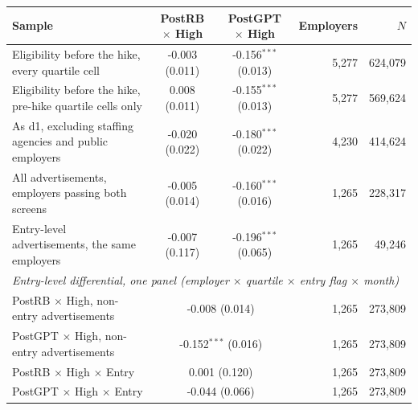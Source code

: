 \setlength{\tabcolsep}{3.5pt}
\begin{tabular}{lccrr}
\toprule
Sample & PostRB $\times$ High & PostGPT $\times$ High & Employers & $N$ \\
\midrule
Eligibility before the hike, every quartile cell & -0.003 (0.011) & -0.156$^{***}$ (0.013) & 5,277 & 624,079 \\
Eligibility before the hike, pre-hike quartile cells only & 0.008 (0.011) & -0.155$^{***}$ (0.013) & 5,277 & 569,624 \\
As d1, excluding staffing agencies and public employers & -0.020 (0.022) & -0.180$^{***}$ (0.022) & 4,230 & 414,624 \\
All advertisements, employers passing both screens & -0.005 (0.014) & -0.160$^{***}$ (0.016) & 1,265 & 228,317 \\
Entry-level advertisements, the same employers & -0.007 (0.117) & -0.196$^{***}$ (0.065) & 1,265 & 49,246 \\
\midrule
\multicolumn{5}{l}{\textit{Entry-level differential, one panel (employer $\times$ quartile $\times$ entry flag $\times$ month)}} \\
PostRB $\times$ High, non-entry advertisements & \multicolumn{2}{c}{-0.008 (0.014)} & 1,265 & 273,809 \\
PostGPT $\times$ High, non-entry advertisements & \multicolumn{2}{c}{-0.152$^{***}$ (0.016)} & 1,265 & 273,809 \\
PostRB $\times$ High $\times$ Entry & \multicolumn{2}{c}{0.001 (0.120)} & 1,265 & 273,809 \\
PostGPT $\times$ High $\times$ Entry & \multicolumn{2}{c}{-0.044 (0.066)} & 1,265 & 273,809 \\
\bottomrule
\end{tabular}
